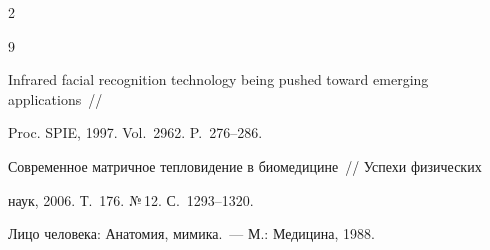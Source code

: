 \begin{multicols}{2}
{{\begin{thebibliography}{9}




Infrared facial recognition technology being pushed toward emerging applications~// 


Proc. SPIE, 1997. Vol.~2962. P.~276--286.









Современное матричное тепловидение в биомедицине~// Успехи физических 


наук, 2006. Т.~176. №\,12. С.~1293--1320.





 \label{end\stat}









Лицо человека: Анатомия, мимика.~--- М.: Медицина, 1988.


 \end{thebibliography}


}


}








\end{multicols}  


